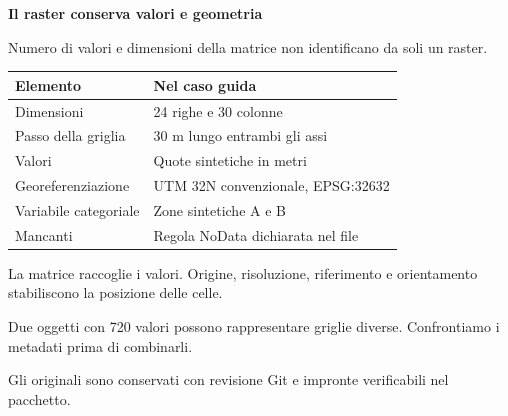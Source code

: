 \documentclass[12pt,aspectratio=1610]{beamer}
\newcommand{\PBody}[1]{\par{\fontsize{11.3}{14.8}\selectfont #1\par}}
\newcommand{\PSmall}[1]{\par{\fontsize{9.8}{13.1}\selectfont #1\par}}
\newcommand{\PInfo}[1]{%
\begin{tcolorbox}[enhanced,arc=1.6mm,boxrule=.55pt,colback=GeoTint,
 colframe=Rule!80!Classical,left=2.3mm,right=2.3mm,top=2mm,bottom=2mm,
 before skip=1mm,after skip=1mm]
\PSmall{#1}\end{tcolorbox}}
\begin{document}
\begin{frame}[plain]\hypertarget{slide6}{}
\begin{lrbox}{\TitleBox}
\begin{minipage}[t]{17.7cm}\raggedright\color{Ink}\fontsize{11.3}{14.8}\selectfont
\color{Navy}\bfseries\fontsize{20.6}{24.5}\selectfont Il raster conserva valori e geometria
\end{minipage}\end{lrbox}

\begin{lrbox}{\RecallBox}
\begin{minipage}[t]{14.3cm}\raggedright\color{Ink}\fontsize{11.3}{14.8}\selectfont
\fontsize{10.3}{13.8}\selectfont Numero di valori e dimensioni della matrice non identificano da soli un raster.
\end{minipage}\end{lrbox}

\begin{lrbox}{\PilotLeftBox}
\begin{minipage}[t]{10.05cm}\raggedright\color{Ink}\fontsize{11.3}{14.8}\selectfont
{\fontsize{10.2}{13.1}\selectfont\renewcommand{\arraystretch}{1.45}\begin{tabular}{@{}p{4.2cm}p{4.8cm}@{}}\toprule
\textbf{Elemento} & \textbf{Nel caso guida}\\\midrule
Dimensioni & 24 righe e 30 colonne\\
Passo della griglia & 30 m lungo entrambi gli assi\\
Valori & Quote sintetiche in metri\\
Georeferenziazione & UTM 32N convenzionale, EPSG:32632\\
Variabile categoriale & Zone sintetiche A e B\\
Mancanti & Regola NoData dichiarata nel file\\
\bottomrule\end{tabular}}

\end{minipage}\end{lrbox}

\begin{lrbox}{\PilotRightBox}
\begin{minipage}[t]{7.55cm}\raggedright\color{Ink}\fontsize{11.3}{14.8}\selectfont
\PBody{La matrice raccoglie i valori. Origine, risoluzione, riferimento e orientamento stabiliscono la posizione delle celle.}
\vspace{2.5mm}
\PInfo{Due oggetti con 720 valori possono rappresentare griglie diverse. Confrontiamo i metadati prima di combinarli.}
\PSmall{Gli originali sono conservati con revisione Git e impronte verificabili nel pacchetto.}


\end{minipage}
\end{lrbox}
\end{frame}
\end{document}
